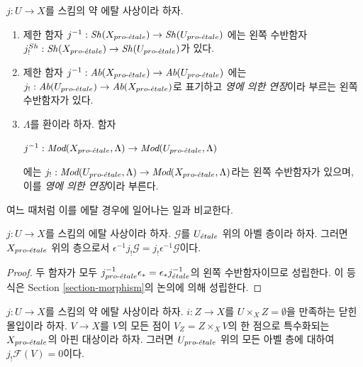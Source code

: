 \begin{definition}
\label{definition-extension-zero}
$j : U \to X$를 스킴의 약 에탈 사상이라 하자.
\begin{enumerate}
\item 제한 함자
$j^{-1} : \mathop{\mathit{Sh}}\nolimits(X_{pro\text{-}\acute{e}tale}) \to \mathop{\mathit{Sh}}\nolimits(U_{pro\text{-}\acute{e}tale})$
에는 왼쪽 수반함자
$j_!^{Sh} : \mathop{\mathit{Sh}}\nolimits(X_{pro\text{-}\acute{e}tale}) \to \mathop{\mathit{Sh}}\nolimits(U_{pro\text{-}\acute{e}tale})$가 있다.
\item 제한 함자
$j^{-1} : \textit{Ab}(X_{pro\text{-}\acute{e}tale}) \to \textit{Ab}(U_{pro\text{-}\acute{e}tale})$
에는
$j_! : \textit{Ab}(U_{pro\text{-}\acute{e}tale}) \to \textit{Ab}(X_{pro\text{-}\acute{e}tale})$로
표기하고 {\it 영에 의한 연장}이라 부르는 왼쪽 수반함자가 있다.
\item $\Lambda$를 환이라 하자. 함자\par
\noindent
$j^{-1} : \textit{Mod}(X_{pro\text{-}\acute{e}tale}, \Lambda) \to
\textit{Mod}(U_{pro\text{-}\acute{e}tale}, \Lambda)$\par
\noindent
에는
$j_! : \textit{Mod}(U_{pro\text{-}\acute{e}tale}, \Lambda) \to
\textit{Mod}(X_{pro\text{-}\acute{e}tale}, \Lambda)$라는 왼쪽 수반함자가 있으며,
이를 {\it 영에 의한 연장}이라 부른다.
\end{enumerate}
\end{definition}

\noindent
여느 때처럼 이를 에탈 경우에 일어나는 일과 비교한다.

\begin{lemma}
\label{lemma-jshriek-comparison}
$j : U \to X$를 스킴의 에탈 사상이라 하자.
$\mathcal{G}$를 $U_{\acute{e}tale}$ 위의 아벨 층이라 하자.
그러면 $X_{pro\text{-}\acute{e}tale}$ 위의 층으로서
$\epsilon^{-1} j_!\mathcal{G} = j_!\epsilon^{-1}\mathcal{G}$이다.
\end{lemma}

\begin{proof}
두 함자가 모두
$j_{pro\text{-}\acute{e}tale}^{-1} \epsilon_* = \epsilon_* j_{\acute{e}tale}^{-1}$의 왼쪽
수반함자이므로 성립한다. 이 등식은 Section \ref{section-morphism}의
논의에 의해 성립한다.
\end{proof}

\begin{lemma}
\label{lemma-jshriek-zero}
$j : U \to X$를 스킴의 약 에탈 사상이라 하자.
$i : Z \to X$를 $U \times_X Z = \emptyset$을 만족하는 닫힌 몰입이라
하자. $V \to X$를 $V$의 모든 점이
$V_Z = Z \times_X V$의 한 점으로 특수화되는 $X_{pro\text{-}\acute{e}tale}$의 아핀
대상이라 하자. 그러면 $U_{pro\text{-}\acute{e}tale}$ 위의 모든 아벨 층에 대하여
$j_!\mathcal{F}(V) = 0$이다.
\end{lemma}

